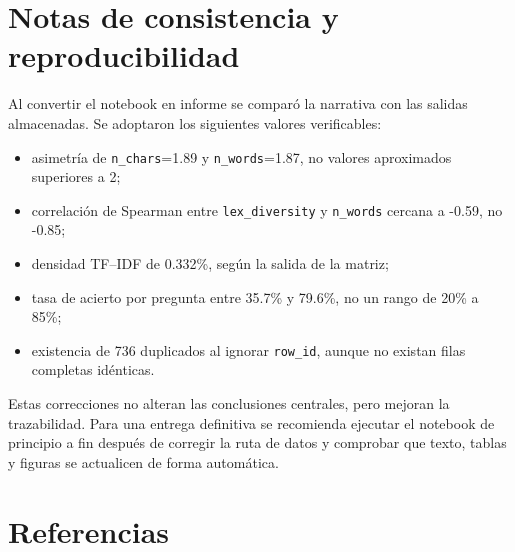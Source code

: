 \documentclass[11pt,oneside,openany]{book}
\newcommand{\codigo}[1]{\texttt{#1}}
\begin{document}
\chapter{Notas de consistencia y reproducibilidad}

Al convertir el notebook en informe se comparó la narrativa con las salidas
almacenadas. Se adoptaron los siguientes valores verificables:

\begin{itemize}
  \item asimetría de \codigo{n\_chars}=1.89 y
        \codigo{n\_words}=1.87, no valores aproximados superiores a 2;
  \item correlación de Spearman entre \codigo{lex\_diversity} y
        \codigo{n\_words} cercana a -0.59, no -0.85;
  \item densidad TF--IDF de 0.332\%, según la salida de la matriz;
  \item tasa de acierto por pregunta entre 35.7\% y 79.6\%, no un rango de
        20\% a 85\%;
  \item existencia de 736 duplicados al ignorar \codigo{row\_id}, aunque no
        existan filas completas idénticas.
\end{itemize}

Estas correcciones no alteran las conclusiones centrales, pero mejoran la
trazabilidad. Para una entrega definitiva se recomienda ejecutar el notebook de
principio a fin después de corregir la ruta de datos y comprobar que texto,
tablas y figuras se actualicen de forma automática.

\backmatter

\chapter*{Referencias}
\end{document}
